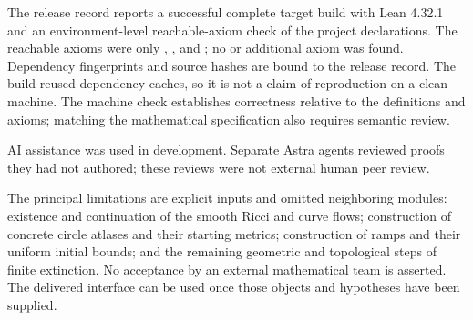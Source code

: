 \documentclass[11pt]{article}
\theoremstyle{remark}\newtheorem{remark}[theorem]{Remark}
\begin{document}
The release record reports a successful complete target build with Lean 4.32.1
and an environment-level reachable-axiom check of the project declarations.
The reachable axioms were only , , and
; no  or additional axiom was found. Dependency
fingerprints and source hashes are bound to the release record. The build reused
dependency caches, so it is not a claim of reproduction on a clean machine.
The machine check establishes correctness relative to the definitions and
axioms; matching the mathematical specification also requires semantic review.

AI assistance was used in development. Separate Astra agents reviewed proofs
they had not authored; these reviews were not external human peer review.

The principal limitations are explicit inputs and omitted neighboring modules:
existence and continuation of the smooth Ricci and curve flows; construction
of concrete circle atlases and their starting metrics; construction of ramps
and their uniform initial bounds; and the remaining geometric and topological
steps of finite extinction. No acceptance by an external mathematical team is
asserted. The delivered interface can be used once those objects and hypotheses
have been supplied.

\appendix
\end{document}
